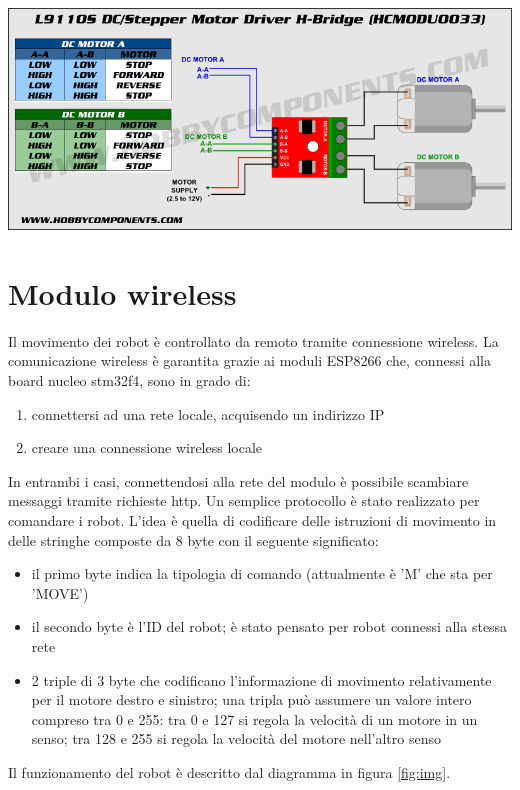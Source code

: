 \documentclass [11pt ,a4paper ,twoside ]{report}
\begin{document}
\begin{center}
\includegraphics[keepaspectratio, width=400pt]{Images/motor_driver_diagram.png}
\end{center}

\section{Modulo wireless} \label{communication}
Il movimento dei robot \`e controllato da remoto tramite connessione wireless. La comunicazione wireless \`e garantita grazie ai moduli ESP8266 che, connessi alla board nucleo stm32f4, sono in grado di:
\begin{enumerate}
	\item connettersi ad una rete locale, acquisendo un indirizzo IP
	\item creare una connessione wireless locale
\end{enumerate}
In entrambi i casi, connettendosi alla rete del modulo \`e possibile scambiare messaggi tramite richieste http. Un semplice protocollo \`e stato realizzato per comandare i robot. L'idea \`e quella di codificare delle istruzioni di movimento in delle stringhe composte da 8 byte con il seguente significato:
\begin{itemize}
	\item il primo byte indica la tipologia di comando (attualmente \`e 'M' che sta per 'MOVE')
	\item il secondo byte \`e l'ID del robot; \`e stato pensato per robot connessi alla stessa rete
	\item 2 triple di 3 byte che codificano l'informazione di movimento relativamente per il motore destro e sinistro; una tripla pu\`o assumere un valore intero compreso tra 0 e 255: tra 0 e 127 si regola la velocit\`a di un motore in un senso; tra 128 e 255 si regola la velocit\`a del motore nell'altro senso
\end{itemize}
Il funzionamento del robot \`e descritto dal diagramma in figura \ref{fig:img}.
\end{document}

